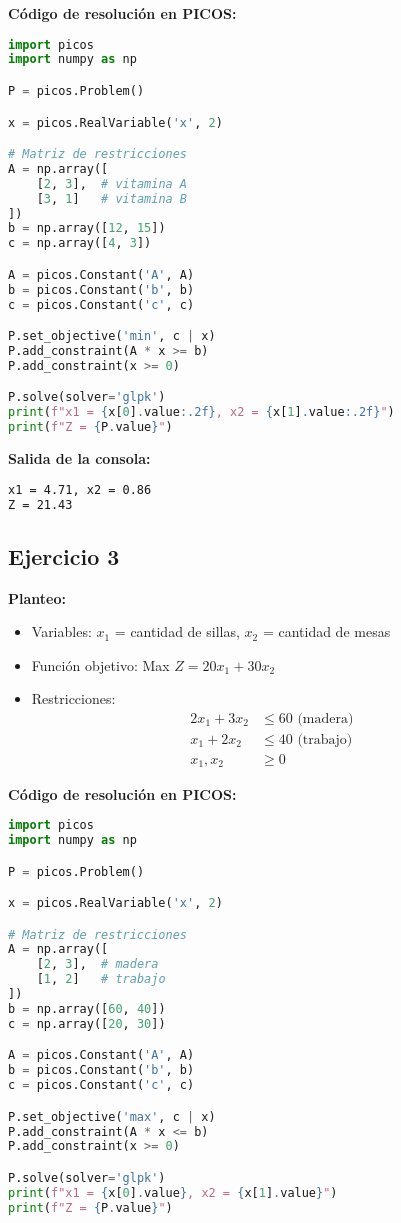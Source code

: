 \documentclass[12pt]{article}
\begin{document}
\textbf{Código de resolución en PICOS:}
\begin{lstlisting}[language=Python]
import picos
import numpy as np

P = picos.Problem()

x = picos.RealVariable('x', 2)

# Matriz de restricciones
A = np.array([
    [2, 3],  # vitamina A
    [3, 1]   # vitamina B
])
b = np.array([12, 15])
c = np.array([4, 3])

A = picos.Constant('A', A)
b = picos.Constant('b', b)
c = picos.Constant('c', c)

P.set_objective('min', c | x)
P.add_constraint(A * x >= b)
P.add_constraint(x >= 0)

P.solve(solver='glpk')
print(f"x1 = {x[0].value:.2f}, x2 = {x[1].value:.2f}")
print(f"Z = {P.value}")
\end{lstlisting}

\textbf{Salida de la consola:}
\begin{lstlisting}[language=bash,backgroundcolor=\color{black},basicstyle=\color{white}\ttfamily,numbers=none]
x1 = 4.71, x2 = 0.86
Z = 21.43
\end{lstlisting}

\subsection*{Ejercicio 3}

\textbf{Planteo:}
\begin{itemize}
\item Variables: $x_1$ = cantidad de sillas, $x_2$ = cantidad de mesas
\item Función objetivo: Max $Z = 20x_1 + 30x_2$
\item Restricciones:
  \begin{align*}
  2x_1 + 3x_2 &\leq 60 \text{ (madera)} \\
  x_1 + 2x_2 &\leq 40 \text{ (trabajo)} \\
  x_1, x_2 &\geq 0
  \end{align*}
\end{itemize}

\textbf{Código de resolución en PICOS:}
\begin{lstlisting}[language=Python]
import picos
import numpy as np

P = picos.Problem()

x = picos.RealVariable('x', 2)

# Matriz de restricciones
A = np.array([
    [2, 3],  # madera
    [1, 2]   # trabajo
])
b = np.array([60, 40])
c = np.array([20, 30])

A = picos.Constant('A', A)
b = picos.Constant('b', b)
c = picos.Constant('c', c)

P.set_objective('max', c | x)
P.add_constraint(A * x <= b)
P.add_constraint(x >= 0)

P.solve(solver='glpk')
print(f"x1 = {x[0].value}, x2 = {x[1].value}")
print(f"Z = {P.value}")
\end{lstlisting}
\end{document}
